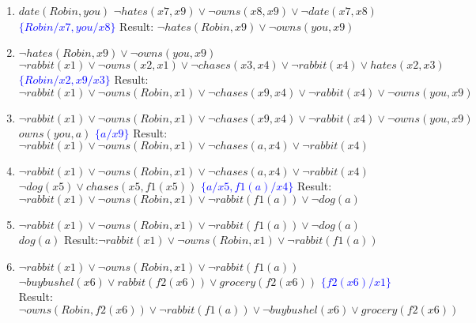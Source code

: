 \documentclass[11pt]{article}
\begin{document}
\begin{enumerate}
\begin{enumerate}
\item $ date(Robin,you)$ \hspace{1cm} $\neg hates(x7,x9) \lor \neg owns(x8,x9) \lor \neg date(x7,x8)$ \hspace{1cm} \textcolor{blue}{$\{Robin/x7,you/x8\}$}  \newline 
Result: $\neg hates(Robin,x9) \lor \neg owns(you,x9)$

\item $\neg hates(Robin,x9) \lor \neg owns(you,x9)$ \hspace{1cm} $\neg rabbit(x1) \lor \neg owns(x2,x1) \lor \neg chases(x3,x4) \lor \neg rabbit(x4) \lor hates(x2,x3)$ \hspace{1cm} \textcolor{blue}{$\{Robin/x2,x9/x3\}$ } \newline 
Result: $\neg rabbit(x1) \lor \neg owns(Robin,x1) \lor \neg chases(x9,x4) \lor \neg rabbit(x4) \lor \neg owns(you,x9)$ 

\item $\neg rabbit(x1) \lor \neg owns(Robin,x1) \lor \neg chases(x9,x4) \lor \neg rabbit(x4) \lor \neg owns(you,x9)$ \hspace{1cm} $owns(you,a)$ \hspace{1cm} \textcolor{blue}{$\{a/x9\}$}  \newline 
Result:$\neg rabbit(x1) \lor \neg owns(Robin,x1) \lor \neg chases(a,x4) \lor \neg rabbit(x4)$  

\item $\neg rabbit(x1) \lor \neg owns(Robin,x1) \lor \neg chases(a,x4) \lor \neg rabbit(x4)$ \hspace{1cm} $\neg dog(x5) \lor chases(x5,f1(x5))$ \hspace{1cm}\textcolor{blue}{ $\{a/x5,f1(a)/x4\}$ } \newline 
Result:$\neg rabbit(x1) \lor \neg owns(Robin,x1) \lor \neg rabbit(f1(a)) \lor \neg dog(a)$ 

\item $\neg rabbit(x1) \lor \neg owns(Robin,x1) \lor \neg rabbit(f1(a)) \lor \neg dog(a)$ \hspace{1cm} $dog(a)$ \hspace{1cm}   \newline 
Result:$\neg rabbit(x1) \lor \neg owns(Robin,x1) \lor \neg rabbit(f1(a))$ 

\item $\neg rabbit(x1) \lor \neg owns(Robin,x1) \lor \neg rabbit(f1(a))$  \hspace{1cm} $\neg buybushel(x6) \lor rabbit(f2(x6)) \lor grocery(f2(x6))$ \hspace{1cm}\textcolor{blue}{ $\{f2(x6)/x1\}$ } \newline 
Result:$ \neg owns(Robin,f2(x6)) \lor \neg rabbit(f1(a)) \lor \neg buybushel(x6) \lor grocery(f2(x6))$ 


\end{enumerate}
\end{enumerate}
\end{document}
